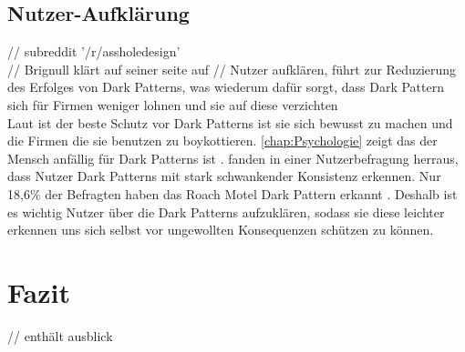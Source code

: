 \documentclass[conference,compsoc,final,a4paper]{IEEEtran}
\begin{document}
\subsection{Nutzer-Aufklärung}
// subreddit '/r/assholedesign' \autocite{Chivukula_2019}\\
// Brignull klärt auf seiner seite auf \autocite{Brignull}
// Nutzer aufklären, führt zur Reduzierung des Erfolges von Dark Patterns, was wiederum dafür sorgt, dass Dark Pattern sich für Firmen weniger lohnen und sie auf diese verzichten\\
Laut \citeauthor{Brignull} ist der beste Schutz vor Dark Patterns ist sie sich bewusst zu machen und die Firmen die sie benutzen zu boykottieren. \autoref{chap:Psychologie} zeigt das der Mensch anfällig für Dark Patterns ist \citeauthor{M.Bhoot2020}. fanden in einer Nutzerbefragung herraus, dass Nutzer Dark Patterns mit stark schwankender Konsistenz erkennen. Nur 18,6\% der Befragten haben das Roach Motel Dark Pattern erkannt \autocite{M.Bhoot2020}. Deshalb ist es wichtig Nutzer über die Dark Patterns aufzuklären, sodass sie diese leichter erkennen uns sich selbst vor ungewollten Konsequenzen schützen zu können.

\section{Fazit}
// enthält ausblick

\nocite{*}
\printbibliography
\end{document}
